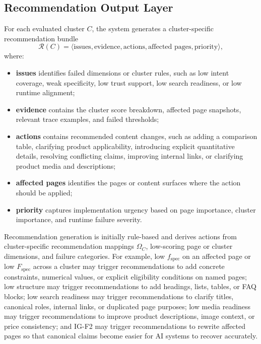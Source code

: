 \documentclass{article}
\begin{document}
\subsection{Recommendation Output Layer}

For each evaluated cluster \(C\), the system generates a cluster-specific recommendation bundle
\[
\mathcal{R}(C)=\langle \text{issues},\text{evidence},\text{actions},\text{affected pages},\text{priority}\rangle,
\]
where:
\begin{itemize}
    \item \textbf{issues} identifies failed dimensions or cluster rules, such as low intent coverage, weak specificity, low trust support, low search readiness, or low runtime alignment;
    \item \textbf{evidence} contains the cluster score breakdown, affected page snapshots, relevant trace examples, and failed thresholds;
    \item \textbf{actions} contains recommended content changes, such as adding a comparison table, clarifying product applicability, introducing explicit quantitative details, resolving conflicting claims, improving internal links, or clarifying product media and descriptions;
    \item \textbf{affected pages} identifies the pages or content surfaces where the action should be applied;
    \item \textbf{priority} captures implementation urgency based on page importance, cluster importance, and runtime failure severity.
\end{itemize}

Recommendation generation is initially rule-based and derives actions from cluster-specific recommendation mappings \(\Omega_C\), low-scoring page or cluster dimensions, and failure categories. For example, low \(f_{\text{spec}}\) on an affected page or low \(F_{\text{spec}}\) across a cluster may trigger recommendations to add concrete constraints, numerical values, or explicit eligibility conditions on named pages; low structure may trigger recommendations to add headings, lists, tables, or FAQ blocks; low search readiness may trigger recommendations to clarify titles, canonical roles, internal links, or duplicated page purposes; low media readiness may trigger recommendations to improve product descriptions, image context, or price consistency; and IG-F2 may trigger recommendations to rewrite affected pages so that canonical claims become easier for AI systems to recover accurately.
\end{document}
